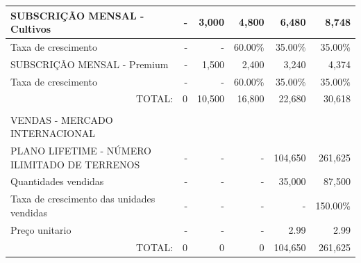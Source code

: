 \documentclass[11pt]{article}
\begin{document}
\begin{adjustbox}{center}
\begin{tabular}{|l|r|r|r|r|r|}
			SUBSCRIÇÃO MENSAL - Cultivos                   &         -                 & 3,000                    & 4,800                    & 6,480                   & 8,748                   \\ \hline
			Taxa de crescimento                            &                  -        &          -                & 60.00\%                  & 35.00\%                  & 35.00\%                  \\ \hline
			SUBSCRIÇÃO MENSAL - Premium                    &              -            & 1,500                     & 2,400                    & 3,240                    & 4,374                    \\ \hline
			Taxa de crescimento                            &               -           &         -                 & 60.00\%                  & 35.00\%                  & 35.00\%                  \\ \hline
			\multicolumn{1}{r}{TOTAL:} & \multicolumn{1}{r}{0} & \multicolumn{1}{r}{10,500} & \multicolumn{1}{r}{16,800} & \multicolumn{1}{r}{22,680} & \multicolumn{1}{r}{30,618} \\
			\multicolumn{1}{l}{} & \multicolumn{1}{l}{} & \multicolumn{1}{l}{} & \multicolumn{1}{l}{} & \multicolumn{1}{l}{} & \multicolumn{1}{l}{} \\
			\multicolumn{1}{l}{VENDAS - MERCADO INTERNACIONAL} & \multicolumn{1}{l}{}& \multicolumn{1}{l}{} & \multicolumn{1}{l}{} & \multicolumn{1}{l}{} & \multicolumn{1}{l}{}\\ \hline
			PLANO LIFETIME - NÚMERO ILIMITADO DE TERRENOS  & -                        & -                   & -                       &  104,650                       & 261,625                         \\ \hline
			Quantidades vendidas                           &        -                  & -                        & -                      & 35,000                       &         87,500                 \\ \hline
			Taxa de crescimento das unidades vendidas      &     -                     & -                   & - & -  & 150.00\%                               \\ \hline
			Preço unitario                                 &              -            & -                     & -                     & 2.99                     &           2.99               \\ \hline
			\multicolumn{1}{r}{TOTAL:} & \multicolumn{1}{r}{0} & \multicolumn{1}{r}{0} & \multicolumn{1}{r}{0} & \multicolumn{1}{r}{104,650} & \multicolumn{1}{r}{261,625} \\

\end{tabular}
\end{adjustbox}
\end{document}
